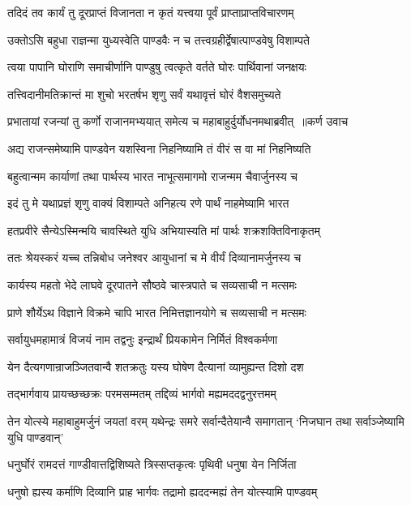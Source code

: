 \twolineshloka
{तदिदं तव कार्यं तु दूरप्राप्तं विजानता}
{न कृतं यत्त्वया पूर्वं प्राप्ताप्राप्तविचारणम्}


\twolineshloka
{उक्तोऽसि बहुधा राज्ञन्मा युध्यस्वेति पाण्डवैः}
{न च तत्त्वग्रहीर्द्वेषात्पाण्डवेषु विशाम्पते}


\twolineshloka
{त्वया पापानि घोराणि समाचीर्णानि पाण्डुषु}
{त्वत्कृते वर्तते घोरः पार्थिवानां जनक्षयः}


\twolineshloka
{तत्त्विदानीमतिक्रान्तं मा शुचो भरतर्षभ}
{शृणु सर्वं यथावृत्तं घोरं वैशसमुच्यते}


\threelineshloka
{प्रभातायां रजन्यां तु कर्णो राजानमभ्ययात्}
{समेत्य च महाबाहुर्दुर्योधनमथाब्रवीत् ॥कर्ण उवाच}
{}


\twolineshloka
{अद्य राजन्समेष्यामि पाण्डवेन यशस्विना}
{निहनिष्यामि तं वीरं स वा मां निहनिष्यति}


\twolineshloka
{बहुत्वान्मम कार्याणां तथा पार्थस्य भारत}
{नाभूत्समागमो राजन्मम चैवार्जुनस्य च}


\twolineshloka
{इदं तु मे यथाप्रज्ञं शृणु वाक्यं विशाम्पते}
{अनिहत्य रणे पार्थं नाहमेष्यामि भारत}


\twolineshloka
{हतप्रवीरे सैन्येऽस्मिन्मयि चावस्थिते युधि}
{अभियास्यति मां पार्थः शक्रशक्तिविनाकृतम्}


\twolineshloka
{ततः श्रेयस्करं यच्च तन्निबोध जनेश्वर}
{आयुधानां च मे वीर्यं दिव्यानामर्जुनस्य च}


\twolineshloka
{कार्यस्य महतो भेदे लाघवे दूरपातने}
{सौष्ठवे चास्त्रपाते च सव्यसाची न मत्समः}


\twolineshloka
{प्राणे शौर्येऽथ विज्ञाने विक्रमे चापि भारत}
{निमित्तज्ञानयोगे च सव्यसाची न मत्समः}


\twolineshloka
{सर्वायुधमहामात्रं विजयं नाम तद्वनुः}
{इन्द्रार्थं प्रियकामेन निर्मितं विश्वकर्मणा}


\twolineshloka
{येन दैत्यगणान्राजञ्जितवान्वै शतक्रतुः}
{यस्य घोषेण दैत्यानां व्यामुह्यन्त दिशो दश}


\twolineshloka
{तद्भार्गवाय प्रायच्छच्छक्रः परमसम्मतम्}
{तद्दिव्यं भार्गवो मह्यमददद्वनुरत्तमम्}


\threelineshloka
{तेन योत्स्ये महाबाहुमर्जुनं जयतां वरम्}
{यथेन्द्रः समरे सर्वान्दैतेयान्वै समागतान्}
{`निजघान तथा सर्वाञ्जेष्यामि युधि पाण्डवान्'}


\twolineshloka
{धनुर्घोरं रामदत्तं गाण्डीवात्तद्विशिष्यते}
{त्रिस्सप्तकृत्वः पृथिवी धनुषा येन निर्जिता}


\twolineshloka
{धनुषो ह्यस्य कर्माणि दिव्यानि प्राह भार्गवः}
{तद्रामो ह्यददन्मह्यं तेन योत्स्यामि पाण्डवम्}


